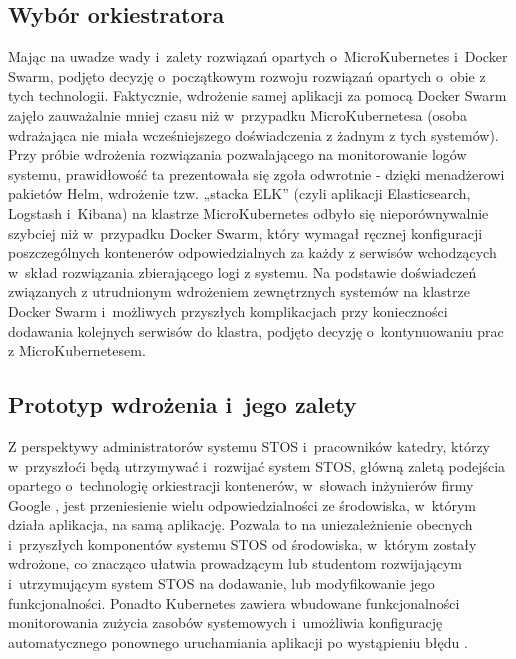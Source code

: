 \subsection{Wybór orkiestratora}
Mając na uwadze wady i~zalety rozwiązań opartych o~MicroKubernetes i~Docker Swarm, podjęto decyzję o~początkowym rozwoju rozwiązań opartych o~obie z tych technologii. Faktycznie, wdrożenie samej aplikacji za pomocą Docker Swarm zajęło zauważalnie mniej czasu niż w~przypadku MicroKubernetesa (osoba wdrażająca nie miała wcześniejszego doświadczenia z żadnym z tych systemów). Przy próbie wdrożenia rozwiązania pozwalającego na monitorowanie logów systemu, prawidłowość ta prezentowała się zgoła odwrotnie - dzięki menadżerowi pakietów Helm, wdrożenie tzw. „stacka ELK” (czyli aplikacji Elasticsearch, Logstash i~Kibana) na klastrze MicroKubernetes odbyło się nieporównywalnie szybciej niż w~przypadku Docker Swarm, który wymagał ręcznej konfiguracji poszczególnych kontenerów odpowiedzialnych za każdy z serwisów wchodzących w~skład rozwiązania zbierającego logi z systemu. Na podstawie doświadczeń związanych z utrudnionym wdrożeniem zewnętrznych systemów na klastrze Docker Swarm i~możliwych przyszłych komplikacjach przy konieczności dodawania kolejnych serwisów do klastra, podjęto decyzję o~kontynuowaniu prac z MicroKubernetesem.

\subsection{Prototyp wdrożenia i~jego zalety}
Z perspektywy administratorów systemu STOS i~pracowników katedry, którzy w~przyszłoći będą utrzymywać i~rozwijać system STOS, główną zaletą podejścia opartego o~technologię orkiestracji kontenerów, w~słowach inżynierów firmy Google \cite{googleKubernetes}, jest przeniesienie wielu odpowiedzialności ze środowiska, w~którym działa aplikacja, na samą aplikację. Pozwala to na uniezależnienie obecnych i~przyszłych komponentów systemu STOS od środowiska, w~którym zostały wdrożone, co znacząco ułatwia prowadzącym lub studentom rozwijającym i~utrzymującym system STOS na dodawanie, lub modyfikowanie jego funkcjonalności. Ponadto Kubernetes zawiera wbudowane funkcjonalności monitorowania zużycia zasobów systemowych i~umożliwia konfigurację automatycznego ponownego uruchamiania aplikacji po wystąpieniu błędu \cite{k8sPod}.

